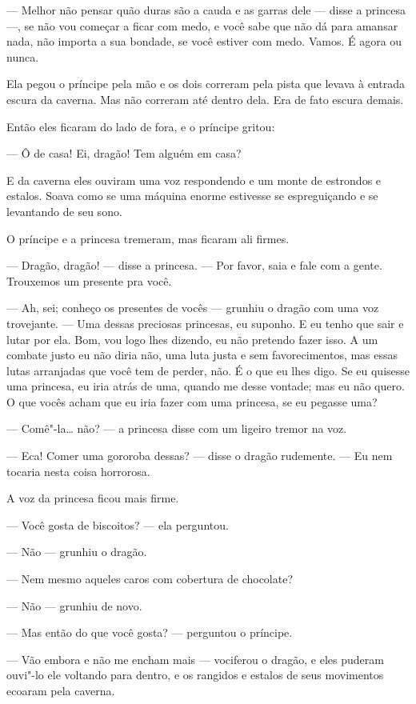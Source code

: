 --- Melhor não pensar quão duras são a cauda e as garras dele --- disse a
princesa ---, se não vou começar a ficar com medo, e você sabe que não
dá para amansar nada, não importa a sua bondade, se você estiver com
medo. Vamos. É agora ou nunca.

Ela pegou o príncipe pela mão e os dois correram pela pista que levava
à entrada escura da caverna. Mas não correram até dentro dela. Era de
fato escura demais.

Então eles ficaram do lado de fora, e o príncipe gritou: 

--- Ô de casa! Ei, dragão! Tem alguém em casa?

E da caverna eles ouviram uma voz respondendo e um monte de estrondos
e estalos. Soava como se uma máquina enorme estivesse se espreguiçando e
se levantando de seu sono.

O príncipe e a princesa tremeram, mas ficaram ali firmes.

--- Dragão, dragão! --- disse a princesa. --- Por favor, saia e fale com a
gente. Trouxemos um presente pra você.

--- Ah, sei; conheço os presentes de vocês --- grunhiu o dragão com uma
voz trovejante. --- Uma dessas preciosas princesas, eu suponho. E eu
tenho que sair e lutar por ela. Bom, vou logo lhes dizendo, eu não
pretendo fazer isso. A um combate justo eu não diria não, uma luta
justa e sem favorecimentos, mas essas lutas arranjadas que você tem
de perder, não. É o que eu lhes digo. Se eu quisesse uma princesa, eu
iria atrás de uma, quando me desse vontade; mas eu não quero. O que
vocês acham que eu iria fazer com uma princesa, se eu pegasse uma?

--- Comê"-la\ldots{} não? --- a princesa disse com um ligeiro tremor na voz. 

--- Eca! Comer uma gororoba dessas? --- disse o dragão rudemente. --- Eu nem
tocaria nesta coisa horrorosa. 

A voz da princesa ficou mais firme.

--- Você gosta de biscoitos? --- ela perguntou.

--- Não --- grunhiu o dragão.

--- Nem mesmo aqueles caros com cobertura de chocolate?

--- Não --- grunhiu de novo.

--- Mas então do que você gosta? --- perguntou o príncipe. 

--- Vão embora e não me encham mais --- vociferou o dragão, e eles puderam
ouvi"-lo ele voltando para dentro, e os rangidos e estalos de seus
movimentos ecoaram pela caverna.


